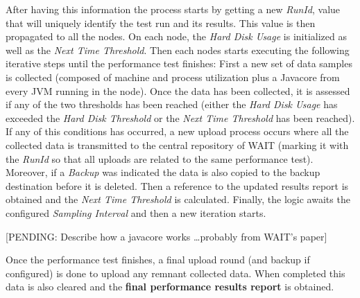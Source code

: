 \documentclass[runningheads,a4paper]{llncs}
\begin{document}
After having this information the process starts by getting a new \emph{RunId},
value that will uniquely identify the test run and its results. This value is
then propagated to all the nodes. On each node, the \emph{Hard Disk Usage} is
initialized as well as the \emph{Next Time Threshold}. Then each nodes starts
executing the following iterative steps until the performance test finishes:
First a new set of data samples is collected (composed of machine and process
utilization plus a Javacore from every JVM running in the node). Once the data 
has been collected, it is assessed if any of the two thresholds has been reached 
(either the \emph{Hard Disk Usage} has exceeded the \emph{Hard Disk
Threshold} or the \emph{Next Time Threshold} has been reached). If any of this
conditions has occurred, a new upload process occurs where all the collected
data is transmitted to the central repository of WAIT (marking it with the
\emph{RunId} so that all uploads are related to the same performance test).
Moreover, if a \emph{Backup} was indicated the data is also copied to the
backup destination before it is deleted. Then a reference to the updated results
report is obtained and the \emph{Next Time Threshold} is calculated. Finally,
the logic awaits the configured \emph{Sampling Interval} and then a new iteration starts.

[PENDING: Describe how a javacore works \ldots probably from WAIT's paper]

Once the performance test finishes, a final upload round (and backup if
configured) is done to upload any remnant collected data. When completed this
data is also cleared and the \textbf{final performance results report} is
obtained.
\end{document}
